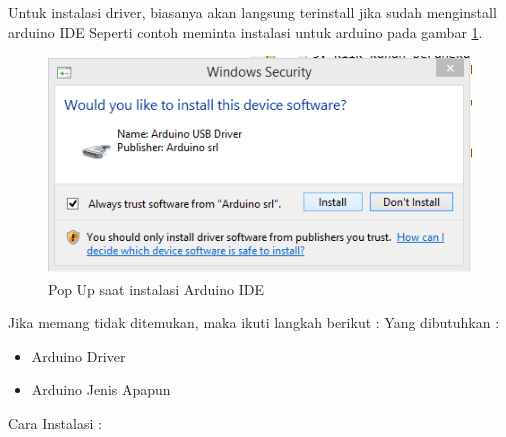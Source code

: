 Untuk instalasi driver, biasanya akan langsung terinstall jika sudah menginstall arduino IDE Seperti contoh meminta instalasi untuk arduino pada gambar \ref{PopUpInstalasi}.
\begin{figure} [ht]
		\centerline{\includegraphics[width=1\textwidth]{figures/5/1174035/Teori/PopUpInstalasi.png}}
		\caption{Pop Up saat instalasi Arduino IDE}
		\label{PopUpInstalasi}
\end{figure}
Jika memang tidak ditemukan, maka ikuti langkah berikut : 
Yang dibutuhkan : 
\begin{itemize}
	\item Arduino Driver
	\item Arduino Jenis Apapun
\end{itemize}
Cara Instalasi : 
